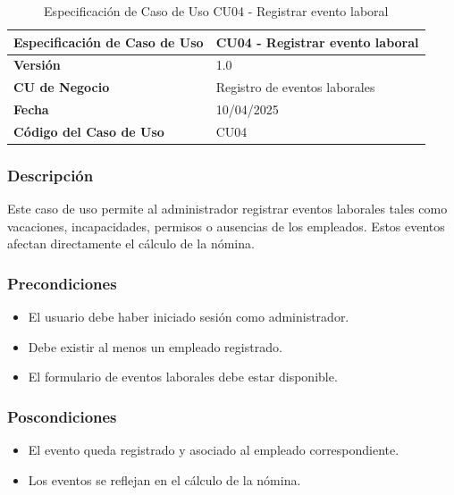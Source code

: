 \begin{table}[h]
	\centering
	\caption{Especificación de Caso de Uso CU04 - Registrar evento laboral}
	\begin{tabular}{|p{5cm}|p{9cm}|}
		\hline
		\textbf{Especificación de Caso de Uso} & CU04 - Registrar evento laboral \\ \hline
		\textbf{Versión}                       & 1.0                             \\ \hline
		\textbf{CU de Negocio}                 & Registro de eventos laborales   \\ \hline
		\textbf{Fecha}                         & 10/04/2025                      \\ \hline
		\textbf{Código del Caso de Uso}        & CU04                            \\ \hline
	\end{tabular}
\end{table}

\subsubsection*{Descripción}
Este caso de uso permite al administrador registrar eventos laborales tales como vacaciones, incapacidades, permisos o ausencias de los empleados. Estos eventos afectan directamente el cálculo de la nómina.

\subsubsection*{Precondiciones}
\begin{itemize}
	\item El usuario debe haber iniciado sesión como administrador.
	\item Debe existir al menos un empleado registrado.
	\item El formulario de eventos laborales debe estar disponible.
\end{itemize}

\subsubsection*{Poscondiciones}
\begin{itemize}
	\item El evento queda registrado y asociado al empleado correspondiente.
	\item Los eventos se reflejan en el cálculo de la nómina.
\end{itemize}

